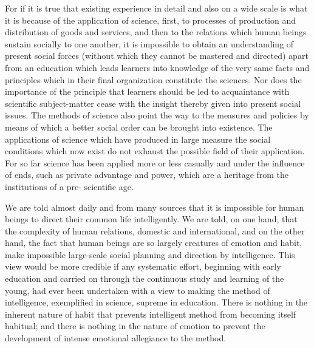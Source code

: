 For if it is true that existing experience in detail and also on a wide scale is what it is 
because of the application of science, first, to processes of production and distribution of 
goods and services, and then to the relations which human beings sustain socially to one 
another, it is impossible to obtain an understanding of present social forces (without 
which they cannot be mastered and directed) apart from an education which leads 
learners into knowledge of the very same facts and principles which in their final 
organization constitute the sciences. Nor does the importance of the principle that 
learners should be led to acquaintance with scientific subject-matter cease with the 
insight thereby given into present social issues. The methods of science also point the 
way to the measures and policies by means of which a better social order can be brought 
into existence. The applications of science which have produced in large measure the 
social conditions which now exist do not exhaust the possible field of their application. 
For so far science has been applied more or less casually and under the influence of ends, 
such as private advantage and power, which are a heritage from the institutions of a pre- 
scientific age. 

We are told almost daily and from many sources that it is impossible for human beings 
to direct their common life intelligently. We are told, on one hand, that the complexity of 
human relations, domestic and international, and on the other hand, the fact that human 
beings are so largely creatures of emotion and habit, make impossible large-scale social 
planning and direction by intelligence. This view would be more credible if any 
systematic effort, beginning with early education and carried on through the continuous 
study and learning of the young, had ever been undertaken with a view to making the 
method of intelligence, exemplified in science, supreme in education. There is nothing in 
the inherent nature of habit that prevents intelligent method from becoming itself 
habitual; and there is nothing in the nature of emotion to prevent the development of 
intense emotional allegiance to the method. 

